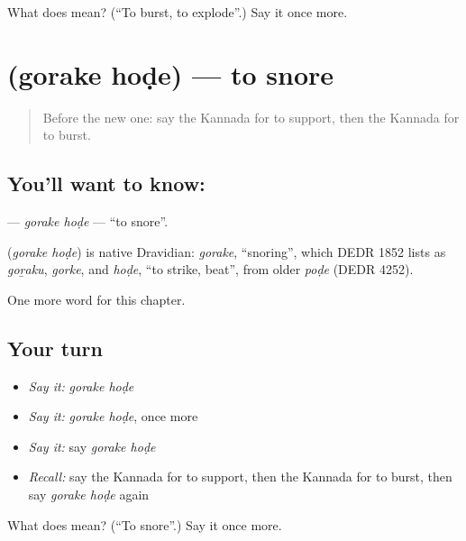 \begin{tcolorbox}[breakable,colback=teal!4,colframe=teal!35!black,title={Before you move on}]
What does  mean? (\textquotedblleft{}To burst, to explode\textquotedblright{}.) Say it once more.
\end{tcolorbox}
\section[\texorpdfstring{\kn{ಗೊರಕೆ} \kn{ಹೊಡೆ} (gorake hoḍe)}{ಗೊರಕೆ ಹೊಡೆ (gorake hoḍe)}]{  (gorake hoḍe) — to snore}

\label{lesson:KA-C167-gorake-hode}



\begin{quote}
Before the new one: say the Kannada for to support, then the Kannada for to burst.
\end{quote}

\subsection*{You'll want to know:  }
\textbf{ } — \emph{gorake hoḍe} — \textquotedblleft{}to snore\textquotedblright{}.

\begin{cousinweb}
\textbf{ } (\emph{gorake hoḍe}) is native Dravidian: \emph{gorake}, \textquotedblleft{}snoring\textquotedblright{}, which DEDR 1852 lists as \emph{goṟaku}, \emph{gorke}, and \emph{hoḍe}, \textquotedblleft{}to strike, beat\textquotedblright{}, from older \emph{poḍe} (DEDR 4252).
\end{cousinweb}

\begin{grammarlens}[title={What you've built}]
One more word for this chapter.
\end{grammarlens}

\subsection*{Your turn}
\begin{itemize}
\raggedright
  \item \emph{Say it:} \emph{gorake hoḍe}
  \item \emph{Say it:} \emph{gorake hoḍe}, once more
  \item \emph{Say it:} say \emph{gorake hoḍe}
  \item \emph{Recall:} say the Kannada for to support, then the Kannada for to burst, then say \emph{gorake hoḍe} again
\end{itemize}

\begin{tcolorbox}[breakable,colback=teal!4,colframe=teal!35!black,title={Before you move on}]
What does   mean? (\textquotedblleft{}To snore\textquotedblright{}.) Say it once more.
\end{tcolorbox}
